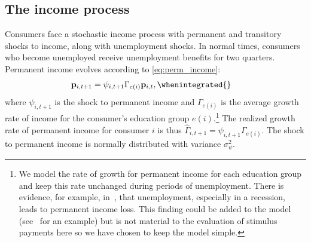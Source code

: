 \documentclass[\latexroot/\projectname]{subfiles}
\begin{document}
\subsection{The income process}\whenintegrated{\label{the-income-process}}

Consumers face a stochastic income process with permanent and transitory shocks to income, along with unemployment shocks.
In normal times, consumers who become unemployed receive unemployment benefits for two quarters.
Permanent income evolves according to \eqref{eq:perm_income}:
\begin{equation}
  \begin{gathered}
    \begin{aligned}
      \mathbf{p}_{i,t+1} & = \psi_{i,t+1}\Gamma_{e(i)}\mathbf{p}_{i,t},
      \whenintegrated{\label{eq:perm_income}} %
    \end{aligned}
  \end{gathered}
\end{equation}
where $\psi_{i,t+1}$ is the shock to permanent income and $\Gamma_{e(i)}$ is the average growth rate of income for the consumer's education group $e(i)$.\footnote{We model the rate of growth for permanent income for each education group and keep this rate unchanged during periods of unemployment.
  There is evidence, for example, in~\cite{davis-recessions-2011}, that unemployment, especially in a recession, leads to permanent income loss.
  This finding could be added to the model (see~\cite{carroll2020modeling} for an example) but is not material to the evaluation of stimulus payments here so we have chosen to keep the model simple.
} The realized growth rate of permanent income for consumer $i$ is thus $\hat{\Gamma}_{i,t+1} = \psi_{i,t+1} \Gamma_{e(i)}$.
The shock to permanent income is normally distributed with variance $\sigma_{\psi}^2$.
\end{document}
